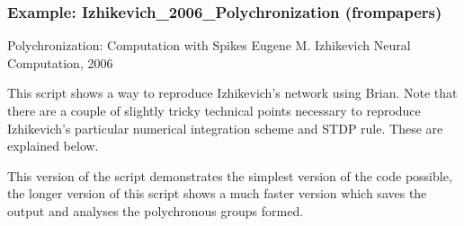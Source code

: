 \documentclass[letterpaper,10pt,english]{manual}
\begin{document}
\hypertarget{index-30}{}\subsubsection{Example: Izhikevich\_2006\_Polychronization (frompapers)}

Polychronization: Computation with Spikes
Eugene M. Izhikevich
Neural Computation, 2006

This script shows a way to reproduce Izhikevich's network using Brian. Note
that there are a couple of slightly tricky technical points necessary to
reproduce Izhikevich's particular numerical integration scheme and STDP rule.
These are explained below.

This version of the script demonstrates the simplest version of the code
possible, the longer version of this script shows a much faster version which
saves the output and analyses the polychronous groups formed.
\end{document}
